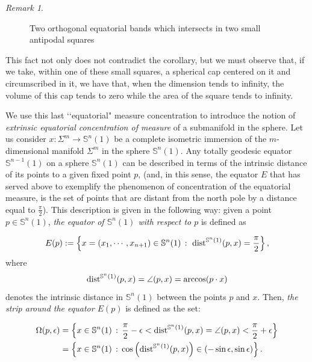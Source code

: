 \documentclass{amsart}
\theoremstyle{definition}
\theoremstyle{remark}
\newtheorem{remark}[theorem]{Remark}
\begin{document}
\begin{remark}
\begin{figure}
     \caption{Two orthogonal equatorial bands which intersects in two small antipodal squares}
     \label{fig:enter-label}
 \end{figure}
 \begin{center}
\end{center}
 This fact not only does not contradict the corollary, but we must observe that, if we take, within one of these small squares, a spherical cap centered on it and circumscribed in it, we have that, when the dimension tends to infinity, the volume of this cap tends to zero while the area of the square tends to infinity.
\end{remark}

We use this last \lq\lq equatorial" measure concentration to introduce the notion of  {\em extrinsic equatorial concentration of measure}  of a submanifold in the sphere. Let us consider $x: \Sigma^m \to \mathbb{S}^n(1)$ be a complete isometric immersion of the  $m$-dimensional manifold $\Sigma^m$ in the sphere $\mathbb{S}^n(1)$. Any totally geodesic equator $\mathbb{S}^{n-1}(1)$ on a sphere  $\mathbb{S}^n(1)$ can be described in terms of the intrinsic distance of its points to a given fixed point $p$, (and, in this sense, the equator $E$ that has served above to exemplify the phenomenon of concentration of the equatorial measure, is the set of points that are distant from the north pole by a distance equal to $\frac{\pi}{2}$). This description is given in the following way: given a point $p \in \mathbb{S}^n(1)$, \emph{the equator of $\mathbb{S}^n(1)$ with respect to $p$} is defined as 

 $$
E(p):=\left\{x=(x_1,\cdots,x_{n+1})\in \mathbb{S}^n(1)\, :\,\,{\rm dist}^{\mathbb{S}^n(1)}(p,x)=\frac{\pi}{2} \right\},
    $$
    where 
    $${\rm dist}^{\mathbb{S}^n(1)}(p,x)=\angle{(p,x)}=\arccos(p\cdot x)$$
    denotes the intrinsic distance in $\mathbb{S}^n(1)$ between the points $p$ and $x$.  Then,   \emph{the strip around the equator $E(p)$} is defined as the set:


$$
\begin{aligned}
\Omega(p,\epsilon)&=\left\lbrace x\in \mathbb{S}^{n}(1)\, : \, \frac{\pi}{2}-\epsilon<{\rm dist}^{\mathbb{S}^{n}(1)}(p,x)=\angle{(p,x)}<\frac{\pi}{2}+\epsilon\right\rbrace\\&=\left\lbrace x\in \mathbb{S}^{n}(1)\, : \,   \cos\left({\rm dist}^{\mathbb{S}^{n}(1)}(p,x)\right)\in ( -\sin\epsilon,\sin\epsilon) \right\rbrace.
\end{aligned}
$$
\end{document}

